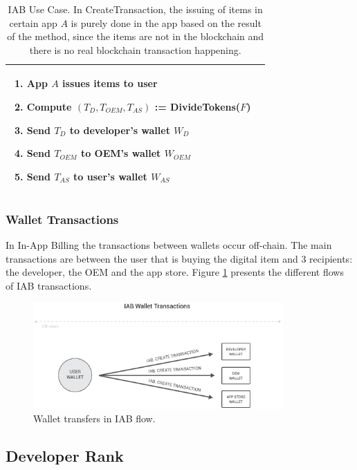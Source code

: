 \begin{table}[H]
\begin{tabular}{|p{}p{}|}
\begin{enumerate}
\begin{enumerate}
		\item App $A$ issues items to user
		\item Compute $(T_D, T_{OEM}, T_{AS})$ := \textsf{DivideTokens}($F$)
		\item Send $T_D$ to developer's wallet $W_D$
		\item Send $T_{OEM}$ to OEM's wallet $W_{OEM}$
		\item Send $T_{AS}$ to user's wallet $W_{AS}$
	\end{enumerate}
\end{enumerate} \\
\hline
\end{tabular}
\caption{IAB Use Case. In \textsf{CreateTransaction}, the issuing of items in certain app $A$ is purely done in the app based on the result of the method, since the items are not in the blockchain and there is no real blockchain transaction happening.}
\label{table: iab_protocol}
\end{table}

\subsubsection{Wallet Transactions}

In In-App Billing the transactions between wallets occur off-chain. The main transactions are between the user that is buying the digital item and 3 recipients: the developer, the OEM and the app store. Figure \ref{fig:wallet_iab_flow} presents the different flows of IAB transactions.

\begin{figure}[!ht]
\centering
\includegraphics[width=0.85\textwidth]{diagrams/wallet_transfers_iab.eps}
\caption{Wallet transfers in IAB flow.}
\label{fig:wallet_iab_flow}
\end{figure}


\subsection{Developer Rank}
\label{subsec:protocol_devrank}

